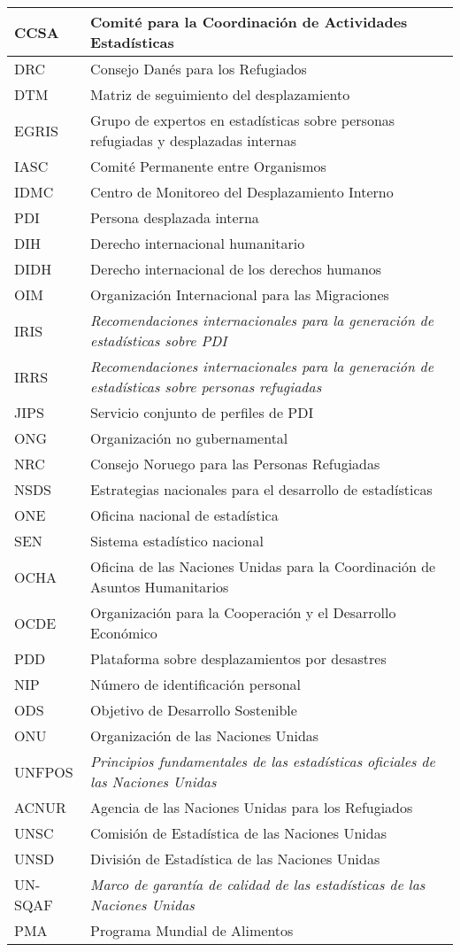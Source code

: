 \documentclass[
]{book}
\begin{document}
\begin{longtable}[]{@{}
  >{\raggedright\arraybackslash}p{}
  >{\raggedright\arraybackslash}p{}@{}}
\toprule
CCSA & Comité para la Coordinación de Actividades Estadísticas \\
\midrule
\endhead
DRC & Consejo Danés para los Refugiados \\
DTM & Matriz de seguimiento del desplazamiento \\
EGRIS & Grupo de expertos en estadísticas sobre personas refugiadas y desplazadas internas \\
IASC & Comité Permanente entre Organismos \\
IDMC & Centro de Monitoreo del Desplazamiento Interno \\
PDI & Persona desplazada interna \\
DIH & Derecho internacional humanitario \\
DIDH & Derecho internacional de los derechos humanos \\
OIM & Organización Internacional para las Migraciones \\
IRIS & \emph{Recomendaciones internacionales para la generación de estadísticas sobre PDI} \\
IRRS & \emph{Recomendaciones internacionales para la generación de estadísticas sobre personas refugiadas} \\
JIPS & Servicio conjunto de perfiles de PDI \\
ONG & Organización no gubernamental \\
NRC & Consejo Noruego para las Personas Refugiadas \\
NSDS & Estrategias nacionales para el desarrollo de estadísticas \\
ONE & Oficina nacional de estadística \\
SEN & Sistema estadístico nacional \\
OCHA & Oficina de las Naciones Unidas para la Coordinación de Asuntos Humanitarios \\
OCDE & Organización para la Cooperación y el Desarrollo Económico \\
PDD & Plataforma sobre desplazamientos por desastres \\
NIP & Número de identificación personal \\
ODS & Objetivo de Desarrollo Sostenible \\
ONU & Organización de las Naciones Unidas \\
UNFPOS & \emph{Principios fundamentales de las estadísticas oficiales de las Naciones Unidas} \\
ACNUR & Agencia de las Naciones Unidas para los Refugiados \\
UNSC & Comisión de Estadística de las Naciones Unidas \\
UNSD & División de Estadística de las Naciones Unidas \\
UN-SQAF & \emph{Marco de garantía de calidad de las estadísticas de las Naciones Unidas} \\
PMA & Programa Mundial de Alimentos \\
\bottomrule
\end{longtable}
\end{document}
